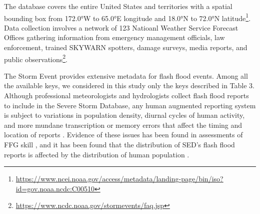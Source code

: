 The database covers the entire United States and territories with a spatial bounding box from 172.0°W to 65.0°E longitude and 18.0°N to 72.0°N latitude\footnote{\url{https://www.ncei.noaa.gov/access/metadata/landing-page/bin/iso?id=gov.noaa.ncdc:C00510}}. Data collection involves a network of 123 Natioanl Weather Service Forecast Offices gathering information from emergency management officials, law enforcement, trained SKYWARN spotters, damage surveys, media reports, and public observations\footnote{\url{https://www.ncdc.noaa.gov/stormevents/faq.jsp}}.

The Storm Event provides extensive metadata for flash flood events. Among all the available keys, we considered in this study only the keys described in Table 3. Although professional meteorologists and hydrologists collect flash flood reports to include in the Severe Storm Database, any human augmented reporting system is subject to variations in population density, diurnal cycles of human activity, and more mundane transcription or memory errors that affect the timing and location of reports \citep{Barthold_2015}. Evidence of these issues has been found in assessments of FFG skill \citep{Clark_2014}, and it has been found that the distribution of SED's flash flood reports is affected by the distribution of human population \cite{Marjerison_2016}. 

